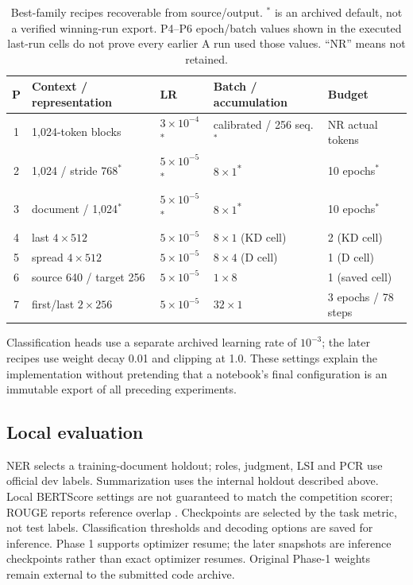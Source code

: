 \documentclass[11pt, oneside]{article}
\begin{document}
\begin{table}[H]\centering\small
\caption{Best-family recipes recoverable from source/output. $^*$ is an archived default, not a verified
winning-run export. P4--P6 epoch/batch values shown in the executed last-run cells do not prove every
earlier A run used those values. ``NR'' means not retained.}
\label{tab:recipes}
\begin{tabular}{cllll}
\toprule P & Context / representation & LR & Batch / accumulation & Budget\\\midrule
1 & 1,024-token blocks & $3\!\times\!10^{-4}$\textsuperscript{*} & calibrated / 256 seq.$^*$ & NR actual tokens\\
2 & 1,024 / stride 768$^*$ & $5\!\times\!10^{-5}$\textsuperscript{*} & $8\!\times\!1$\textsuperscript{*} & 10 epochs$^*$\\
3 & document / 1,024$^*$ & $5\!\times\!10^{-5}$\textsuperscript{*} & $8\!\times\!1$\textsuperscript{*} & 10 epochs$^*$\\
4 & last $4\!\times\!512$ & $5\!\times\!10^{-5}$ & $8\!\times\!1$ (KD cell) & 2 (KD cell)\\
5 & spread $4\!\times\!512$ & $5\!\times\!10^{-5}$ & $8\!\times\!4$ (D cell) & 1 (D cell)\\
6 & source 640 / target 256 & $5\!\times\!10^{-5}$ & $1\!\times\!8$ & 1 (saved cell)\\
7 & first/last $2\!\times\!256$ & $5\!\times\!10^{-5}$ & $32\!\times\!1$ & 3 epochs / 78 steps\\\bottomrule
\end{tabular}\end{table}

Classification heads use a separate archived learning rate of $10^{-3}$; the later recipes use weight
decay 0.01 and clipping at 1.0. These settings explain the implementation without pretending that a
notebook's final configuration is an immutable export of all preceding experiments.

\subsection{Local evaluation}
NER selects a training-document holdout; roles, judgment, LSI and PCR use official dev labels.
Summarization uses the internal holdout described above. Local BERTScore settings are not guaranteed to
match the competition scorer; ROUGE reports reference overlap \cite{rouge}. Checkpoints are selected
by the task metric, not test labels. Classification thresholds and decoding options are saved for inference.
Phase 1 supports optimizer resume; the later snapshots are inference checkpoints rather than exact
optimizer resumes. Original Phase-1 weights remain external to the submitted code archive.
\end{document}
